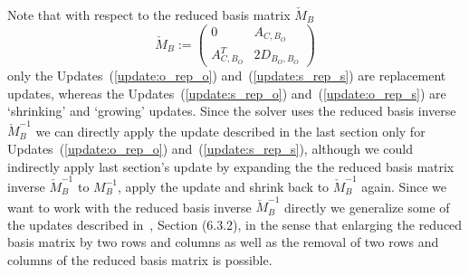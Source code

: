 \documentclass[a4paper]{article}
\begin{document}
Note that with respect to the reduced basis matrix $\check{M}_{B}$
\begin{equation}
\label{def:M_B_red}
\check{M}_{B}:=
\left(
\begin{array}{c|c}
0 & A_{C, B_{O}} \\
\hline
A_{C, B_{O}}^{T} & 2D_{B_{O}, B_{O}}
\end{array}
\right)
\end{equation}
only the Updates~(\ref{update:o_rep_o}) and~(\ref{update:s_rep_s}) are
replacement updates, whereas the Updates~(\ref{update:s_rep_o})
and~(\ref{update:o_rep_s}) are `shrinking' and `growing' updates.
Since the solver uses the reduced basis inverse $\check{M}_{B}^{-1}$ we can
directly apply the update described in the last section only for
Updates~(\ref{update:o_rep_o}) and~(\ref{update:s_rep_s}), although we could
indirectly apply last section's update by expanding the the reduced basis
matrix inverse $\check{M}_{B}^{-1}$ to $M_{B}^{-1}$, apply the update
and shrink back to $\check{M}_{B}^{-1}$ again.
Since we want to work with the reduced basis inverse $\check{M}_{B}^{-1}$
directly we generalize some of the updates described in~\cite{Sven},
Section (6.3.2), in the sense that enlarging the reduced basis matrix by two
rows and columns as well as the removal of two rows and columns of the reduced
basis matrix is possible.
\end{document}
